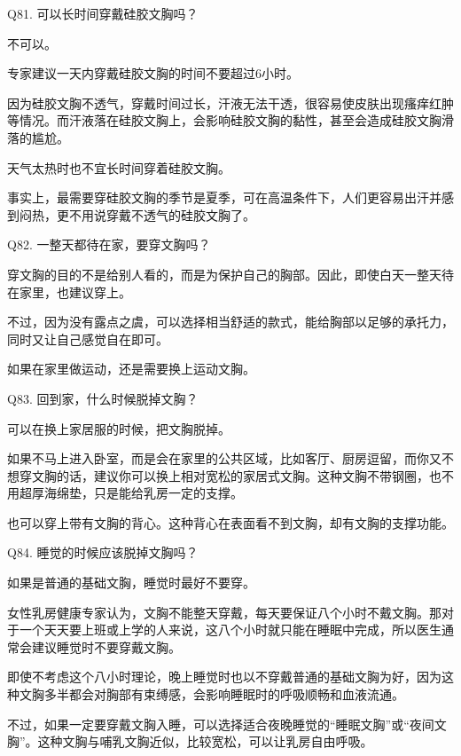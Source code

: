 \documentclass[12pt,UTF8]{ctexbook}
\begin{document}
Q81. 可以长时间穿戴硅胶文胸吗？


不可以。

专家建议一天内穿戴硅胶文胸的时间不要超过6小时。

因为硅胶文胸不透气，穿戴时间过长，汗液无法干透，很容易使皮肤出现瘙痒红肿等情况。而汗液落在硅胶文胸上，会影响硅胶文胸的黏性，甚至会造成硅胶文胸滑落的尴尬。

天气太热时也不宜长时间穿着硅胶文胸。

事实上，最需要穿硅胶文胸的季节是夏季，可在高温条件下，人们更容易出汗并感到闷热，更不用说穿戴不透气的硅胶文胸了。





Q82. 一整天都待在家，要穿文胸吗？


穿文胸的目的不是给别人看的，而是为保护自己的胸部。因此，即使白天一整天待在家里，也建议穿上。

不过，因为没有露点之虞，可以选择相当舒适的款式，能给胸部以足够的承托力，同时又让自己感觉自在即可。

如果在家里做运动，还是需要换上运动文胸。





Q83. 回到家，什么时候脱掉文胸？


可以在换上家居服的时候，把文胸脱掉。

如果不马上进入卧室，而是会在家里的公共区域，比如客厅、厨房逗留，而你又不想穿文胸的话，建议你可以换上相对宽松的家居式文胸。这种文胸不带钢圈，也不用超厚海绵垫，只是能给乳房一定的支撑。

也可以穿上带有文胸的背心。这种背心在表面看不到文胸，却有文胸的支撑功能。





Q84. 睡觉的时候应该脱掉文胸吗？


如果是普通的基础文胸，睡觉时最好不要穿。

女性乳房健康专家认为，文胸不能整天穿戴，每天要保证八个小时不戴文胸。那对于一个天天要上班或上学的人来说，这八个小时就只能在睡眠中完成，所以医生通常会建议睡觉时不要穿戴文胸。

即使不考虑这个八小时理论，晚上睡觉时也以不穿戴普通的基础文胸为好，因为这种文胸多半都会对胸部有束缚感，会影响睡眠时的呼吸顺畅和血液流通。

不过，如果一定要穿戴文胸入睡，可以选择适合夜晚睡觉的“睡眠文胸”或“夜间文胸”。这种文胸与哺乳文胸近似，比较宽松，可以让乳房自由呼吸。
\end{document}
